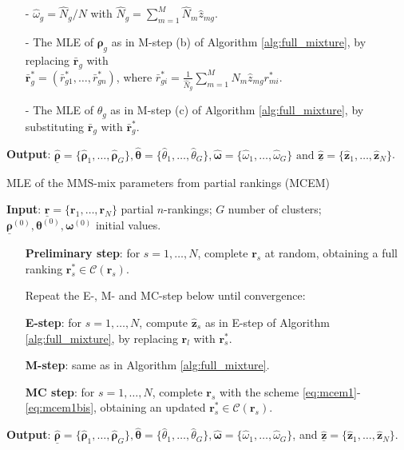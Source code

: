 \begin{algorithm}[h!]
\begin{enumerate}
    \begin{itemize}
        \item[-] $\hat\omega_g =\hat{N}_g/N$ with $\hat{N}_g=\sum_{m=1}^M\hat{N}_m\hat z_{mg}$.
        \item[-] The MLE of $\bm\rho_g$ as in M-step (b) of Algorithm \ref{alg:full_mixture},  by replacing $\bar{\bm r}_g$ with\\
        $\bar{\bm r}^*_g = (\bar r^*_{g1},\dots, \bar r^*_{gn})$, where $\bar r^*_{gi} = \frac{1}{\hat N_g}\sum_{m=1}^M \hat N_m \hat z_{mg}r^*_{mi}$.
        \item[-] The MLE of $\theta_g$ as in M-step (c) of Algorithm \ref{alg:full_mixture}, by substituting $\bar{\bm r}_g$ with $\bar{\bm r}^*_g$. 
    \end{itemize}
\end{enumerate}
   \hspace*{\algorithmicindent} \textbf{Output}: $\underline{\hat{\bm{\rho}}}=\{\hat{\bm{\rho}}_1,\dots,\hat{\bm{\rho}}_G\},{\hat{\bm\theta}}=\{\hat{\theta}_1,\dots,\hat{\theta}_G\},{\hat{\bm\omega}}=\{\hat\omega_1,\dots,\hat\omega_G\}\text{ and }\underline{\hat{\bm z}}=\{\bm \hat z_1,\dots,\bm \hat z_N\}$. 
\end{algorithm}


\begin{algorithm}[h!]\small
\caption{MLE of the MMS-mix parameters from partial rankings (MCEM)}
\label{alg:partial_mcem}
\hspace*{\algorithmicindent} \textbf{Input}: $\underline{\bm{r}}=\{\bm{r}_1,\dots,\bm{r}_N\}$ partial $n$-rankings; $G$ number of clusters; $\underline{\bm{\rho}}^{(0)}, \bm{\theta}^{(0)}, \bm{\omega}^{(0)}$ initial values.


\begin{enumerate}
\item[] \textbf{Preliminary step}: for $s=1,\dots,N$, complete $\bm{r}_s$ at random, obtaining a full ranking $\bm{r}^*_s\in \mathcal{C}(\bm r_s)$.
    \item[] Repeat the E-, M- and MC-step below until convergence:        
    \item[] \textbf{E-step}: for $s=1,\dots,N$,  compute $\hat{\bm z}_s$ as in E-step of Algorithm \ref{alg:full_mixture}, by replacing $\bm r_l$ with $\bm r^*_s$.
     
 \item[] \textbf{M-step}: same as in Algorithm \ref{alg:full_mixture}.

 \item[] \textbf{MC step}: for $s=1,\dots,N$, complete $\bm{r}_s$  with the scheme \eqref{eq:mcem1}-\eqref{eq:mcem1bis}, obtaining an updated $\bm{r}^*_s\in\mathcal{C}(\bm r_s)$. 
\end{enumerate}
   \hspace*{\algorithmicindent} \textbf{Output}: $\underline{\hat{\bm{\rho}}}=\{\hat{\bm{\rho}}_1,\dots,\hat{\bm{\rho}}_G\},{\hat{\bm\theta}}=\{\hat{\theta}_1,\dots,\hat{\theta}_G\},{\hat{\bm\omega}}=\{\hat\omega_1,\dots,\hat\omega_G\}$, and $\underline{\hat{\bm z}}=\{\bm \hat z_1,\dots,\bm \hat z_N\}$. 
\end{algorithm}

